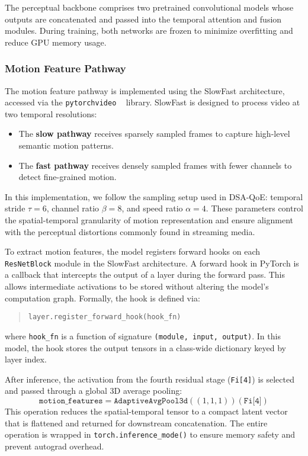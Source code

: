 The perceptual backbone comprises two pretrained convolutional models whose outputs are concatenated and passed into the temporal attention and fusion modules. During training, both networks are frozen to minimize overfitting and reduce GPU memory usage.

\subsubsection{Motion Feature Pathway}

The motion feature pathway is implemented using the SlowFast architecture, accessed via the \texttt{pytorchvideo} ~\cite{fan2021pytorchvideodeeplearninglibrary} library. SlowFast is designed to process video at two temporal resolutions:
\begin{itemize}
    \item The \textbf{slow pathway} receives sparsely sampled frames to capture high-level semantic motion patterns.
    \item The \textbf{fast pathway} receives densely sampled frames with fewer channels to detect fine-grained motion.
\end{itemize}

In this implementation, we follow the sampling setup used in DSA-QoE: temporal stride $\tau=6$, channel ratio $\beta=8$, and speed ratio $\alpha=4$. These parameters control the spatial-temporal granularity of motion representation and ensure alignment with the perceptual distortions commonly found in streaming media.

To extract motion features, the model registers forward hooks on each \texttt{ResNetBlock} module in the SlowFast architecture. A forward hook in PyTorch is a callback that intercepts the output of a layer during the forward pass. This allows intermediate activations to be stored without altering the model’s computation graph. Formally, the hook is defined via:
\begin{quote}
\texttt{layer.register\_forward\_hook(hook\_fn)}
\end{quote}
where \texttt{hook\_fn} is a function of signature \texttt{(module, input, output)}. In this model, the hook stores the output tensors in a class-wide dictionary keyed by layer index.

After inference, the activation from the fourth residual stage (\texttt{Fi[4]}) is selected and passed through a global 3D average pooling:
\[
\texttt{motion\_features} = \texttt{AdaptiveAvgPool3d}((1,1,1))(\texttt{Fi[4]})
\]
This operation reduces the spatial-temporal tensor to a compact latent vector that is flattened and returned for downstream concatenation. The entire operation is wrapped in \texttt{torch.inference\_mode()} to ensure memory safety and prevent autograd overhead.

